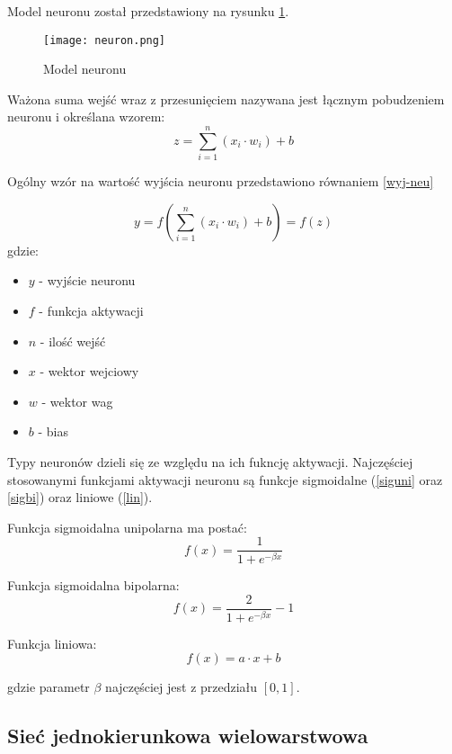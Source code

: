 \documentclass[12pt,twoside]{article}
\begin{document}
Model neuronu został przedstawiony na rysunku \ref{neuron}.

\begin{figure}[ht]
\label{neuron}
\centering
\texttt{[image: neuron.png]}
\caption{Model neuronu}
\end{figure}

Ważona suma wejść wraz z przesunięciem nazywana jest łącznym pobudzeniem neuronu i określana wzorem:
\begin{equation}\label{pobudzenie}
z = \sum_{i=1}^{n}(x_i \cdot w_i) + b 
\end{equation}

Ogólny wzór na wartość wyjścia neuronu przedstawiono równaniem \ref{wyj-neu}

\begin{equation}\label{wyj-neu}
y = f \left(  \sum_{i=1}^{n}(x_i \cdot w_i) + b \right) = f(z)
\end{equation}
gdzie:
\begin{itemize}
\item $y$ - wyjście neuronu
\item $f$ - funkcja aktywacji
\item $n$ - ilość wejść
\item $x$ - wektor wejciowy
\item $w$ - wektor wag
\item $b$  - bias
\end{itemize}
Typy neuronów dzieli się ze względu na ich fukncję aktywacji. Najczęściej stosowanymi funkcjami aktywacji neuronu są funkcje sigmoidalne (\ref{siguni} oraz \ref{sigbi}) oraz liniowe (\ref{lin}).

Funkcja sigmoidalna unipolarna ma postać:
\begin{equation}\label{siguni}
f(x) = \frac{1}{1 + e^{-\beta x}}
\end{equation}

Funkcja sigmoidalna bipolarna:
\begin{equation}\label{sigbi}
f(x) = \frac{2}{1 + e^{-\beta x}} -1
\end{equation}

Funkcja liniowa:
\begin{equation}\label{lin}
f(x) = a \cdot x + b
\end{equation}

gdzie parametr $\beta$ najczęściej jest z przedziału $[0, 1]$.
\clearpage

\subsection{Sieć jednokierunkowa wielowarstwowa}
\end{document}
